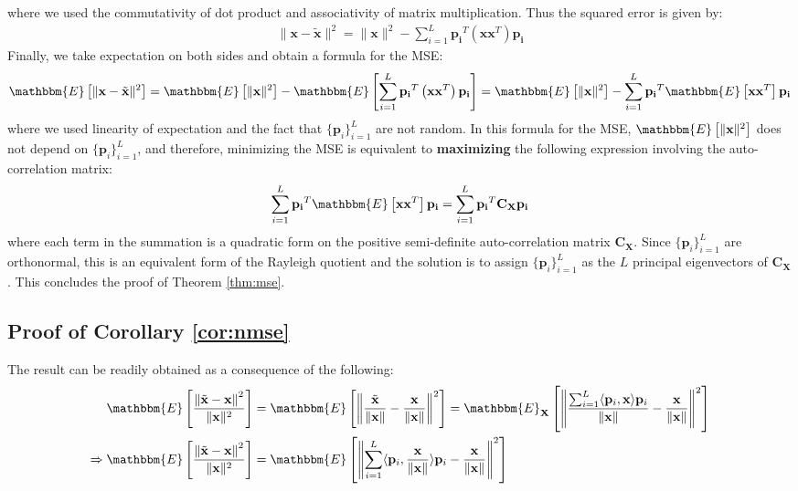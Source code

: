 \documentclass{article}
\theoremstyle{plain}
\begin{document}
where we used the commutativity of dot product and associativity of matrix multiplication. Thus the squared error is given by:
\begin{align*}
    \lVert\mathbf{x}-\tilde{\mathbf{x}}\rVert^2=\lVert\mathbf{x}\rVert^2 - \sum_{i=1}^L\mathbf{p_i}^T\left(\mathbf{x}\mathbf{x}^T\right)\mathbf{p_i}
\end{align*}
Finally, we take expectation on both sides and obtain a formula for the MSE:
\begin{align*}
    \mathbbm{E}\left[\lVert\mathbf{x}-\tilde{\mathbf{x}}\rVert^2\right] = \mathbbm{E}\left[\lVert\mathbf{x}\rVert^2\right] - \mathbbm{E}\left[\sum_{i=1}^L\mathbf{p_i}^T\left(\mathbf{x}\mathbf{x}^T\right)\mathbf{p_i}\right]=\mathbbm{E}\left[\lVert\mathbf{x}\rVert^2\right] -\sum_{i=1}^L\mathbf{p_i}^T\mathbbm{E}\left[\mathbf{x}\mathbf{x}^T\right]\mathbf{p_i}
\end{align*}
where we used linearity of expectation and the fact that $\{\mathbf{p}_i\}_{i=1}^L$ are not random. In this formula for the MSE, $\mathbbm{E}\left[\lVert\mathbf{x}\rVert^2\right]$ does not depend on $\{\mathbf{p}_i\}_{i=1}^L$, and therefore, minimizing the MSE is equivalent to \textbf{maximizing} the following expression involving the auto-correlation matrix: 
\begin{align*}
    \sum_{i=1}^L\mathbf{p_i}^T\mathbbm{E}\left[\mathbf{x}\mathbf{x}^T\right]\mathbf{p_i} = \sum_{i=1}^L\mathbf{p_i}^T\mathbf{C}_{\mathbf{X}}\mathbf{p_i}
\end{align*}
where each term in the summation is a quadratic form on the positive semi-definite auto-correlation matrix $\mathbf{C}_{\mathbf{X}}$. Since $\{\mathbf{p}_i\}_{i=1}^L$ are orthonormal, this is an equivalent form of the Rayleigh quotient \cite{horn2012matrix} and the solution is to assign $\{\mathbf{p}_i\}_{i=1}^L$ as the $L$ principal eigenvectors of $\mathbf{C}_{\mathbf{X}}$. This concludes the proof of Theorem \ref{thm:mse}.

\subsection{Proof of Corollary \ref{cor:nmse}}
\label{app:cor:nmse}
The result can be readily obtained as a consequence of the following:
    \begin{align*}
        \mathbbm{E}\left[\frac{\left\lVert\tilde{\mathbf{x}}-\mathbf{x}\right\rVert^2}{\lVert \mathbf{x} \rVert^2}\right] &= \mathbbm{E}\left[\left\lVert\frac{\tilde{\mathbf{x}}}{\lVert \mathbf{x} \rVert}-\frac{\mathbf{x}}{\lVert \mathbf{x} \rVert}\right\rVert^2\right] = \mathbbm{E}_\mathbf{X}\left[\left\lVert\frac{\sum_{i=1}^L \langle \mathbf{p}_i , \mathbf{x} \rangle \mathbf{p}_i}{\lVert \mathbf{x} \rVert}-\frac{\mathbf{x}}{\lVert \mathbf{x} \rVert}\right\rVert^2\right] \\ \Rightarrow \mathbbm{E}\left[\frac{\left\lVert\tilde{\mathbf{x}}-\mathbf{x}\right\rVert^2}{\lVert \mathbf{x} \rVert^2}\right] &= \mathbbm{E}\left[\left\lVert\sum_{i=1}^L \langle \mathbf{p}_i , \frac{\mathbf{x}}{\lVert \mathbf{x} \rVert} \rangle \mathbf{p}_i-\frac{\mathbf{x}}{\lVert \mathbf{x} \rVert}\right\rVert^2\right]
    \end{align*}
\end{document}
